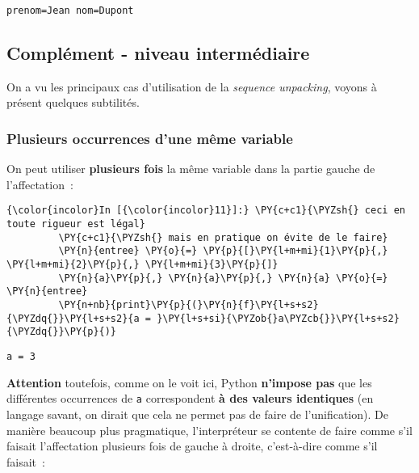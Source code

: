     \begin{Verbatim}[commandchars=\\\{\}]
prenom=Jean nom=Dupont

    \end{Verbatim}

    \hypertarget{compluxe9ment---niveau-intermuxe9diaire}{%
\subsection{Complément - niveau
intermédiaire}\label{compluxe9ment---niveau-intermuxe9diaire}}

    On a vu les principaux cas d'utilisation de la \emph{sequence
unpacking}, voyons à présent quelques subtilités.

    \hypertarget{plusieurs-occurrences-dune-muxeame-variable}{%
\subsubsection{Plusieurs occurrences d'une même
variable}\label{plusieurs-occurrences-dune-muxeame-variable}}

    On peut utiliser \textbf{plusieurs fois} la même variable dans la partie
gauche de l'affectation~:

    \begin{Verbatim}[commandchars=\\\{\}]
{\color{incolor}In [{\color{incolor}11}]:} \PY{c+c1}{\PYZsh{} ceci en toute rigueur est légal}
         \PY{c+c1}{\PYZsh{} mais en pratique on évite de le faire}
         \PY{n}{entree} \PY{o}{=} \PY{p}{[}\PY{l+m+mi}{1}\PY{p}{,} \PY{l+m+mi}{2}\PY{p}{,} \PY{l+m+mi}{3}\PY{p}{]}
         \PY{n}{a}\PY{p}{,} \PY{n}{a}\PY{p}{,} \PY{n}{a} \PY{o}{=} \PY{n}{entree}
         \PY{n+nb}{print}\PY{p}{(}\PY{n}{f}\PY{l+s+s2}{\PYZdq{}}\PY{l+s+s2}{a = }\PY{l+s+si}{\PYZob{}a\PYZcb{}}\PY{l+s+s2}{\PYZdq{}}\PY{p}{)}
\end{Verbatim}


    \begin{Verbatim}[commandchars=\\\{\}]
a = 3

    \end{Verbatim}

    \textbf{Attention} toutefois, comme on le voit ici, Python
\textbf{n'impose pas} que les différentes occurrences de \texttt{a}
correspondent \textbf{à des valeurs identiques} (en langage savant, on
dirait que cela ne permet pas de faire de l'unification). De manière
beaucoup plus pragmatique, l'interpréteur se contente de faire comme
s'il faisait l'affectation plusieurs fois de gauche à droite,
c'est-à-dire comme s'il faisait~:

